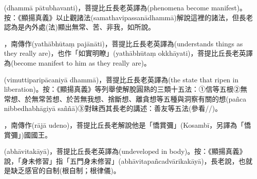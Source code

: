 \startitemgroup[noteitems]
\item{}(dhammā pātubhavanti)，菩提比丘長老英譯為(phenomena become manifest)。按：《顯揚真義》以止觀諸法(samathavipassanādhammā)解說這裡的諸法，但長老認為是內外處(法)顯出無常、苦、非我，如所說。
\stopitemgroup

\startitemgroup[noteitems]
\item{}，南傳作(yathābhūtaṃ pajānāti)，菩提比丘長老英譯為(understands things as they really are)，也作「如實明瞭」(yathābhūtaṃ okkhāyati)，菩提比丘長老英譯為(become manifest to him as they really are)。
\stopitemgroup

\startitemgroup[noteitems]
\item{}(vimuttiparipācaniyā dhammā)，菩提比丘長老英譯為(the state that ripen in liberation)。按：《顯揚真義》等列舉使解脫圓熟的三類十五法：①信等五根②無常想、於無常苦想、於苦無我想、捨斷想、離貪想等五種與洞察有關的想(pañca nibbedhabhāgiyā saññā)③對昧西其長老的講述：善友等五法(參看//)。
\stopitemgroup

\startitemgroup[noteitems]
\item{}，南傳作(rājā udeno)，菩提比丘長老解說他是「憍賞彌」(Kosambī，另譯為「憍賞彌」)國國王。
\stopitemgroup

\startitemgroup[noteitems]
\item{}(abhāvitakāyā)，菩提比丘長老英譯為(undeveloped in body)。按：《顯揚真義》說，「身未修習」指「五門身未修習」(abhāvitapañcadvārikakāyā)，長老說，也就是缺乏感官的自制(根自制；根律儀)。
\stopitemgroup

